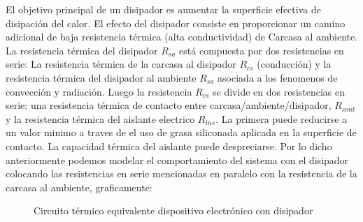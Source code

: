 \documentclass[10pt]{article}
\begin{document}
El objetivo principal de un disipador es aumentar la superficie efectiva de disipación del calor. El efecto del disipador
consiste en proporcionar un camino adicional de baja resistencia térmica (alta conductividad) de Carcasa al ambiente. La resistencia térmica del disipador $R_{sa}$ está
compuesta por dos resistencias en serie: La resistencia térmica de la carcasa al disipador $R_{cs}$ (conducción) y la resistencia térmica del disipador al ambiente $R_{sa}$
asociada a los fenomenos de convección y radiación. Luego la resistencia $R_{cs}$ se divide en dos resistencias en serie: una resistencia térmica de contacto entre
carcasa/ambiente/disipador, $R_{cont}$ y la resistencia térmica del aislante electrico $R_{ins}$. La primera puede reducirse a un valor minimo a traves de el uso de
grasa siliconada aplicada en la superficie de contacto. La capacidad térmica del aislante puede despreciarse. Por lo dicho anteriormente podemos modelar el comportamiento del sistema
con el disipador colocando las resistencias en serie mencionadas en paralelo con la resistencia de la carcasa al ambiente, graficamente:
\begin{figure}[H]
\centering
{}
\caption{Circuito térmico equivalente dispositivo electrónico con disipador}\label{fig:circuito_disipador}
\end{figure}
\end{document}
